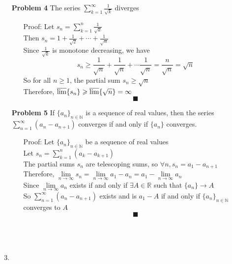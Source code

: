 \documentclass[a4paper,12pt]{report}
\begin{document}
\begin{enumerate}
\item[\bf{Problem 4}] The series $\sum\limits_{k=1}^{\infty} \frac{1}{\sqrt{k}}$ diverges
	\begin{enumerate}
	\item[Proof:] 
	Let $s_n = \sum\limits_{k=1}^{n} \frac{1}{\sqrt{k}}$ \\
	Then $s_n = 1 + \frac{1}{\sqrt{2}} + \cdots + \frac{1}{\sqrt{n}}$ \\
	Since $\frac{1}{\sqrt{k}}$ is monotone decreasing, we have
	\[
		s_n \geqslant 
		\frac{1}{\sqrt{n}} + \frac{1}{\sqrt{n}} + \cdots \frac{1}{\sqrt{n}}
		= \frac{n}{\sqrt{n}} = \sqrt{n}
	\]
	So for all $n \geqslant 1$, the partial sum $s_n \geqslant \sqrt{n}$ \\
	Therefore, $\varlimsup\{s_n\} \geqslant \varlimsup\{\sqrt{n}\} = \infty$ 
	\[\blacksquare\]
	\end{enumerate}
\pagebreak
\item[\bf{Problem 5}] If $\{a_n\}_{n\in\mathbb{N}}$ is a sequence of real values, then the series $\sum\limits_{n=1}^{\infty}(a_n - a_{n+1})$ converges if and only if $\{a_n\}$ converges.
	\begin{enumerate}
	\item[Proof:] 
	Let $\{a_n\}_{n \in \mathbb{N}}$ be a sequence of real values \\
	Let $s_n = \sum\limits_{k=1}^{n}(a_k - a_{k+1})$ \\
	The partial sums $s_n$ are telescoping sums, so $\forall n, s_n = a_1 - a_{n+1}$ \\
	Therefore, $\lim\limits_{n \to \infty} s_n = \lim\limits_{n \to \infty} a_1 - a_n = a_1 - \lim\limits_{n \to \infty} a_n$ \\
	Since $\lim\limits_{n \to \infty} a_n$ exists if and only if $\exists A \in \mathbb{R}$ such that $\{a_n\} \to A$ \\
	So $\sum\limits_{n=1}^{\infty}(a_n - a_{n+1})$ exists and is $a_1 - A$ if and only if $\{a_n\}_{n\in\mathbb{N}}$ converges to $A$
	\[\blacksquare\]
	\\\\\\
	
	\end{enumerate}

\item

\end{enumerate}
\end{document}
